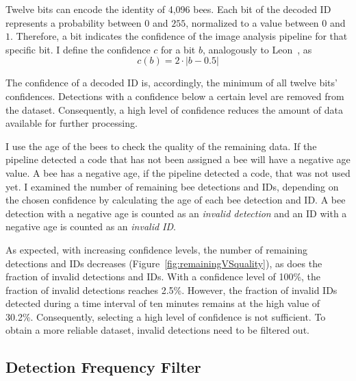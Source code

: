 Twelve bits can encode the identity of 4,096 bees.
Each bit of the decoded ID represents a probability between $0$ and $255$, normalized to a value between $0$ and $1$.
Therefore, a bit indicates the confidence of the image analysis pipeline for that specific bit.
I define the confidence $c$ for a bit $b$, analogously to Leon~\textcite[p.~14]{leon2016}, as
\begin{equation}
\label{eq:confidence}
c(b)=2\cdot|b-0.5|
\end{equation}

The confidence of a decoded ID is, accordingly, the minimum of all twelve bits' confidences.
Detections with a confidence below a certain level are removed from the dataset.
Consequently, a high level of confidence reduces the amount of data available for further processing.

I use the age of the bees to check the quality of the remaining data.
If the pipeline detected a code that has not been assigned a bee will have a negative age value.
A bee has a negative age, if the pipeline detected a code, that was not used yet.
I examined the number of remaining bee detections and IDs, depending on the chosen confidence by calculating the age of each bee detection and ID.
A bee detection with a negative age is counted as an \emph{invalid detection} and an ID with a negative age is counted as an \emph{invalid ID}.

As expected, with increasing confidence levels, the number of remaining detections and IDs decreases (Figure~\ref{fig:remainingVSquality}), as does the fraction of invalid detections and IDs.
With a confidence level of 100\%, the fraction of invalid detections reaches 2.5\%.
However, the fraction of invalid IDs detected during a time interval of ten minutes remains at the high value of 30.2\%. Consequently, selecting a high level of confidence is not sufficient.
To obtain a more reliable dataset, invalid detections need to be filtered out.


\subsection{Detection Frequency Filter}
\label{subsubsec:dataset:filter}


